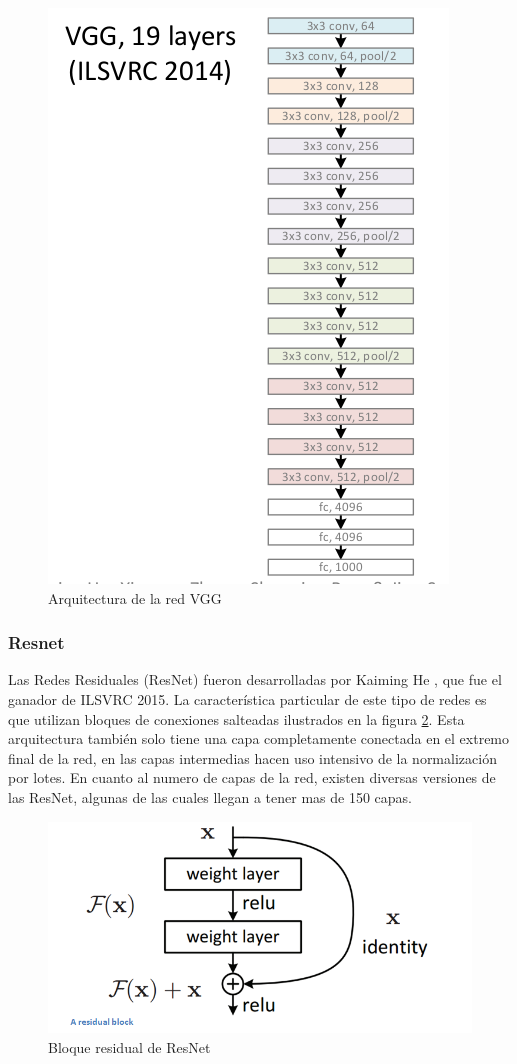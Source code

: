\documentclass[a4paper,11pt,spanish]{book}
\begin{document}
	  \begin{figure}[h]
	    \begin{center}
	    \includegraphics[width=0.6\linewidth]{./img/vgg-19.png}
	    \end{center}
	    \caption{Arquitectura de la red VGG}
	    \label{fig:vgg}
	  \end{figure}	

	\subsubsection{Resnet}
	  Las Redes Residuales (ResNet) fueron desarrolladas por Kaiming He \cite{Kaiming:ResNet}, que fue el ganador de ILSVRC 2015. La característica particular de este tipo de redes 
	  es que utilizan bloques de conexiones salteadas ilustrados en la figura \ref{fig:resnet}. 
	  Esta arquitectura también solo tiene una capa completamente conectada en el extremo final de la red, en las capas intermedias hacen uso intensivo de la normalización por lotes.
	  En cuanto al numero de capas de la red, existen diversas versiones de las ResNet, algunas de las cuales llegan a tener mas de 150 capas.
	
	  \begin{figure}[h]
	    \begin{center}
	    \includegraphics[width=0.6\linewidth]{./img/resnet_block.png}
	    \end{center}
	    \caption{Bloque residual de ResNet}
	    \label{fig:resnet}
	  \end{figure}	
	
\end{document}
